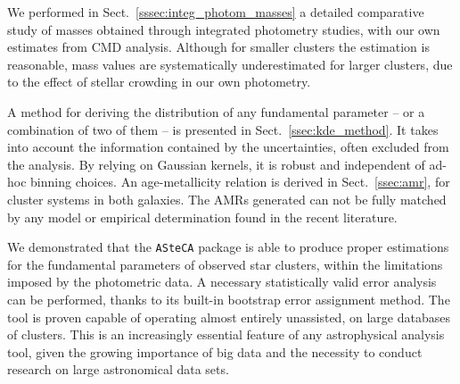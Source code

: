 \documentclass[draft]{aa}
\begin{document}
We performed in Sect.~\ref{sssec:integ_photom_masses} a detailed comparative
study of masses obtained through integrated photometry studies, with our own
estimates from CMD analysis.
Although for smaller clusters the estimation is reasonable, mass values
are systematically underestimated for larger
clusters, due to the effect of stellar crowding in our own photometry.

A method for deriving the distribution of any fundamental parameter -- or a
combination of two of them -- is presented in Sect.~\ref{ssec:kde_method}. It
takes into account the information contained by the uncertainties, often
excluded from the analysis. By relying on Gaussian kernels, it is robust and
independent of ad-hoc binning choices.
%
An age-metallicity relation is derived in Sect.~\ref{ssec:amr}, for
cluster systems in both galaxies. The AMRs generated can not be fully matched by
any model or empirical determination found in the recent literature.

We demonstrated that the \texttt{ASteCA} package is able to produce proper
estimations for the fundamental parameters of observed star clusters,
within the limitations imposed by the photometric data.
A necessary statistically valid error analysis
can be performed, thanks to its built-in bootstrap error assignment method.
%
The tool is proven capable of operating almost entirely unassisted, on large
databases of clusters. This is an increasingly essential feature
of any astrophysical analysis tool, given the growing importance of big data and
the necessity to conduct research on large astronomical data sets.




\end{document}
